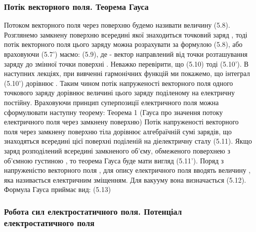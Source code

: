 \subsubsection{Потік векторного поля. Теорема Гауса}

Потоком векторного поля   через поверхню   будемо називати величину 
 									(5.8).
Розглянемо замкнену поверхню   всередині якої знаходиться точковий заряд  , тоді потік векторного поля цього заряду можна розрахувати за формулою (5.8), або враховуючи (5.7') маємо:
 								(5.9), 		де   - вектор направлений від точки розташування заряду до змінної точки поверхні  .
Неважко перевірити, що  					(5.10) 
тоді  		  			(5.10').
В наступних лекціях, при вивченні гармонічних функцій ми покажемо, що інтеграл (5.10') дорівнює  .
Таким чином потік напруженості векторного поля одного точкового заряду дорівнює величині цього заряду поділеному на електричну постійну.
Враховуючи принцип суперпозиції електричного поля можна сформулювати наступну теорему:
Теорема 1 (Гауса про значення потоку електричного поля через замкнену поверхню) Потік напруженості векторного поля через замкнену поверхню   тіла дорівнює алгебраїчній сумі зарядів, що знаходяться всередині цієї поверхні поділеній на діелектричну сталу   	
 										(5.11).
Якщо заряд розподілений всередині замкненого об'єму, обмеженого поверхнею   з об'ємною густиною   , то теорема Гауса буде мати вигляд  									(5.11').
Поряд з напруженістю векторного поля  , для опису електричного поля вводять величину  , яка називається електричним зміщенням. Для вакууму вона визначається   									(5.12).
Формула Гауса приймає вид:  	 				(5.13)

\subsubsection{Робота сил електростатичного поля. Потенціал електростатичного поля}

